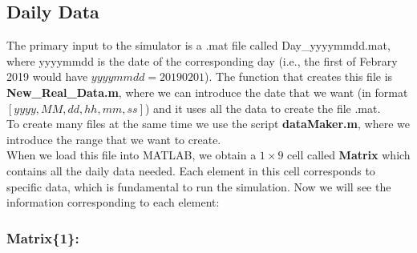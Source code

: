 \documentclass[12pt]{article}
\theoremstyle{definition}
\theoremstyle{remark}
\begin{document}
\subsection{Daily Data}

The primary input to the simulator is a .mat file called Day\_yyyymmdd.mat, where yyyymmdd is the date of the corresponding day (i.e., the first of Febrary 2019 would have $yyyymmdd=20190201$). The function that creates this file is \textbf{New\_Real\_Data.m}, where we can introduce the date that we want (in format $[yyyy,MM,dd,hh,mm,ss]$) and it uses all the data to create the file .mat.\\
To create many files at the same time we use the script \textbf{dataMaker.m}, where we introduce the range that we want to create.\\
When we load this file into MATLAB, we obtain a $1\times9$ cell called \textbf{Matrix} which contains all the daily data needed. Each element in this cell corresponds to specific data, which is fundamental to run the simulation. Now we will see the information corresponding to each element:

\subsubsection{Matrix\{1\}:}
\end{document}
